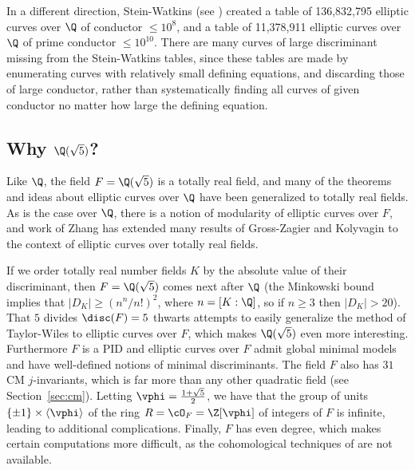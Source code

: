 \documentclass{amsart}
\begin{document}
In a different direction, Stein-Watkins (see \cite{stein-watkins:ants5, bmsw:bulletins}) 
created a table of 136,832,795 elliptic curves over $\Q$ of conductor $\leq 10^8$, and a
table of 11,378,911 elliptic curves over $\Q$ of prime conductor $\leq
10^{10}$. 
There are many curves of large discriminant missing from the
Stein-Watkins tables, since these tables are made by enumerating
curves with relatively small defining equations, and discarding those
of large conductor, rather than systematically finding all curves of
given conductor no matter how large the defining equation.

 
\subsection{Why $\Q(\sqrt{5})$?}

Like $\Q$, the field $F=\Q(\sqrt{5})$ is a totally real field, and
many of the theorems and ideas about elliptic curves over $\Q$ have
been generalized to totally real fields. As is the case over $\Q$,
there is a notion of modularity of elliptic curves over $F$, and work
of Zhang \cite{zhang:heightsshimura} has extended many results of
Gross-Zagier \cite{gross-zagier} and Kolyvagin
\cite{kolyvagin:mordellweil} to the context of elliptic curves over
totally real fields.

If we order totally real number fields $K$ by the absolute value of
their discriminant, then $F=\Q(\sqrt{5})$ comes next after $\Q$ (the
Minkowski bound implies that $|D_K| \geq (n^n/n!)^2$, where
$n=[K:\Q]$, so if $n\geq 3$ then $|D_K|>20$). That $5$ divides
$\disc(F)=5$ thwarts attempts to easily generalize the
method of Taylor-Wiles to elliptic curves over $F$, which makes
$\Q(\sqrt{5})$ even more interesting. Furthermore $F$ is a PID and
elliptic curves over $F$ admit global minimal models and have well-defined 
notions of minimal discriminants.
The field $F$ also has $31$ CM $j$-invariants, which is far more than
 any other quadratic field (see Section~\ref{sec:cm}).  Letting
 $\vphi=\frac{1+\sqrt{5}}{2}$, we have that the group of units
 $\{\pm 1\} \times \langle \vphi \rangle$ of the
ring $R=\cO_F=\Z[\vphi]$ of integers of $F$ is infinite, leading to
additional complications.  Finally, $F$ has even degree, which
makes certain computations more difficult, as the cohomological
techniques of \cite{greenberg-voight:shimura} are not available. 
\end{document}
